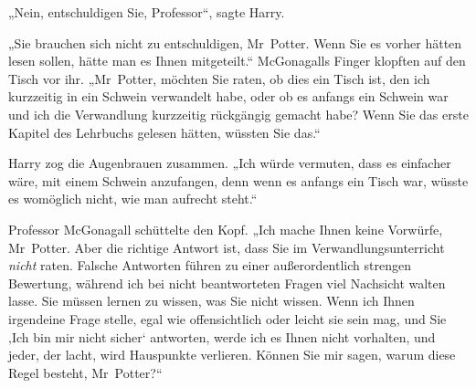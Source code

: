 „Nein, entschuldigen Sie, Professor“, sagte Harry.

„Sie brauchen sich nicht zu entschuldigen, Mr~Potter. Wenn Sie es vorher hätten lesen sollen, hätte man es Ihnen mitgeteilt.“ McGonagalls Finger klopften auf den Tisch vor ihr.
„Mr~Potter, möchten Sie raten, ob dies ein Tisch ist, den ich kurzzeitig in ein Schwein verwandelt habe, oder ob es anfangs ein Schwein war und ich die Verwandlung kurzzeitig rückgängig gemacht habe? Wenn Sie das erste Kapitel des Lehrbuchs gelesen hätten, wüssten Sie das.“

Harry zog die Augenbrauen zusammen.
„Ich würde vermuten, dass es einfacher wäre, mit einem Schwein anzufangen, denn wenn es anfangs ein Tisch war, wüsste es womöglich nicht, wie man aufrecht steht.“

Professor McGonagall schüttelte den Kopf.
„Ich mache Ihnen keine Vorwürfe, Mr~Potter. Aber die richtige Antwort ist, dass Sie im Verwandlungsunterricht \emph{nicht} raten. Falsche Antworten führen zu einer außerordentlich strengen Bewertung, während ich bei nicht beantworteten Fragen viel Nachsicht walten lasse. Sie müssen lernen zu wissen, was Sie nicht wissen. Wenn ich Ihnen irgendeine Frage stelle, egal wie offensichtlich oder leicht sie sein mag, und Sie ‚Ich bin mir nicht sicher‘ antworten, werde ich es Ihnen nicht vorhalten, und jeder, der lacht, wird Hauspunkte verlieren. Können Sie mir sagen, warum diese Regel besteht, Mr~Potter?“

